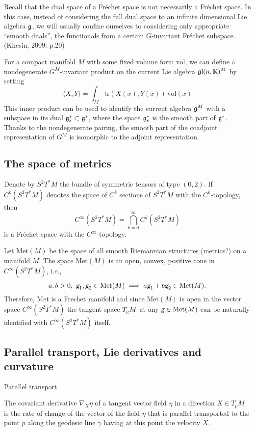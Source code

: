 \documentclass{article}
\theoremstyle{plain}
\theoremstyle{definition}
\newcommand{\R}{\ensuremath{\mathbb{R}}}
\newcommand{\g}{\ensuremath{\textsl{g}}}
\newcommand{\Met}{\ensuremath{\mathrm{Met}}}
\newcommand{\Vol}{\ensuremath{\mathrm{vol}}}
\newcommand{\tr}{\ensuremath{\mathrm{tr}}}
\newcommand{\mf}{\ensuremath{\mathfrak}}
\begin{document}
Recall that the dual space of a Fréchet space is not necessarily a Fréchet space. In this case, instead of considering the full dual space to an infinite dimensional Lie algebra $\mf g$, we will usually confine ourselves to considering only appropriate ``smooth duals'', the functionals from a certain $G$-invariant Fréchet subspace. (Khesin, 2009: p.20)

For a compact manifold $M$ with some fixed volume form $\Vol$, we can
define a nondegenerate $G^M$-invariant product on the current Lie algebra $\mf g\mf l(n,\R)^M$ by setting
\[
\langle X,Y\rangle = \int_M\tr(X(x),Y(x))\,\Vol(x)
\]
This inner product can be used to identify the current algebra $\mf g^M$ with a subspace in its dual $\mf g_s^*\subset \mf g^*$, where the space $\mf g_s^*$ is the smooth part of $\mf g^*$. Thanks to the nondegenerate pairing, the smooth part of the coadjoint representation of $G^M$ is isomorphic to the adjoint representation.




\subsection{The space of metrics}
Denote by $S^2T^*M$ the bundle of  symmetric tensors of type $(0,2)$. If $C^k(S^2T^*M)$ denotes the space of $C^k$ sections of  $S^2T^*M$ with the $C^k$-topology, then
\[
C^\infty (S^2T^*M) = \bigcap_{k=0}^\infty C^k(S^2T^*M)
\]
is a Fréchet space with the $C^\infty$-topology.

Let $\Met(M)$ be the space of all smooth Riemannian structures (metrics?) on a manifold $M$.
The space $\Met(M)$ is an open, convex, positive cone in $C^\infty(S^2T^*M)$, i.e.,
\[
a,b>0,\ \g_1,\g_2\in \Met(M) \implies a\g_1+b\g_2\in\Met(M).
\]
Therefore, $\Met$ is a Frechet manifold and since $\Met(M)$ is open in the vector space $C^\infty (S^2T^*M)$  the tangent space $T_\g M$ at any $\g\in \Met(M)$ can be naturally identified with $C^\infty (S^2T^*M)$ itself.

\subsection{Parallel transport, Lie derivatives and curvature}
Parallel transport

The covariant derivative $\nabla_X\eta$ of a tangent vector field $\eta$ in a
direction $X\in T_pM$ is the rate of change of the vector of the field $\eta$ that is parallel transported to the point $p$ along the geodesic line $\gamma$ having at this point the velocity $X$.
\end{document}
